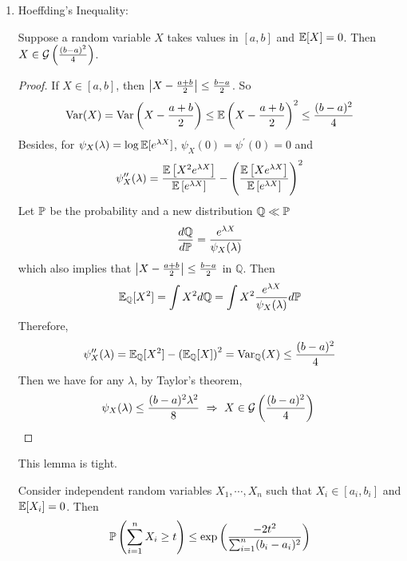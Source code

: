 \begin{enumerate}[label=\arabic{*}.]
	\item Hoeffding's Inequality:
	\begin{lem}
	    Suppose a random variable $X$ takes values in $[a,b]$ and $\mathbb{E}[X] = 0$. Then $X \in \mathcal{G}\left(\frac{(b-a)^2}{4}\right)$.
	\end{lem}
	\begin{proof}
	    If $X \in [a,b]$, then $\left\lvert X-\frac{a+b}{2}\right\lvert \leq \frac{b-a}{2}$. So
	    \begin{equation*}
	    	\operatorname{Var}(X) = \operatorname{Var}\left(X - \frac{a+b}{2}\right) \leq \mathbb{E}\left(X-\frac{a+b}{2}\right)^2 \leq \frac{(b-a)^2}{4}
	    \end{equation*}
	    Besides, for $\psi_X(\lambda) = \log \mathbb{E}[e^{\lambda X}]$, $\psi_X(0) = \psi^\prime(0) = 0$ and
	    \begin{equation*}
	    	\psi_X^{\prime\prime}(\lambda) = \frac{\mathbb{E}\left[X^2e^{\lambda X}\right]}{\mathbb{E}\left[e^{\lambda X}\right]} - \left(\frac{\mathbb{E}\left[Xe^{\lambda X}\right]}{\mathbb{E}\left[e^{\lambda X}\right]} \right)^2
	    \end{equation*}
	    Let $\mathbb{P}$ be the probability and a new distribution $\mathbb{Q} \ll \mathbb{P}$
	    \begin{equation*}
	    	\frac{d\mathbb{Q}}{d\mathbb{P}} = \frac{e^{\lambda X}}{\psi_X(\lambda)}
	    \end{equation*}
	    which also implies that $\left\lvert X-\frac{a+b}{2}\right\lvert \leq \frac{b-a}{2}$ in $\mathbb{Q}$. Then
	    \begin{equation*}
	    	\mathbb{E}_{\mathbb{Q}}[X^2] = \int X^2 d\mathbb{Q} = \int X^2  \frac{e^{\lambda X}}{\psi_X(\lambda)} d\mathbb{P}
	    \end{equation*}
	    Therefore,
	    \begin{equation*}
	    	\psi_X^{\prime\prime}(\lambda) = \mathbb{E}_{\mathbb{Q}}[X^2] - \left(\mathbb{E}_{\mathbb{Q}}[X]\right)^2 = \operatorname{Var}_{\mathbb{Q}}(X) \leq \frac{(b-a)^2}{4}
	    \end{equation*}
	    Then we have for any $\lambda$, by Taylor's theorem,
	    \begin{equation*}
	    	\psi_X(\lambda) \leq \frac{(b-a)^2\lambda^2}{8} ~\Rightarrow~X \in \mathcal{G}\left(\frac{(b-a)^2}{4}\right) \qedhere
	    \end{equation*}
	\end{proof}
	\begin{rmk}
	    This lemma is tight.
	\end{rmk}
	\begin{cor}
	    Consider independent random variables $X_1,\cdots,X_n$ such that $X_i \in [a_i,b_i]$ and $\mathbb{E}[X_i] = 0$. Then
	    \begin{equation*}
	    	\mathbb{P}\left(\sum_{i=1}^nX_i \geq t\right) \leq \exp\left(\frac{-2t^2}{\sum_{i=1}^n(b_i-a_i)^2}\right)
	    \end{equation*}
	\end{cor}


\end{enumerate}
